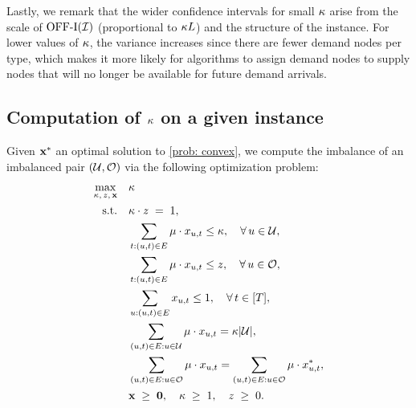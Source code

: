 {{Lastly, we remark that the wider confidence intervals for small $\kappa$ arise from the scale of $\mathrm{\mathrm{OFF}}\textrm{-}\mathrm{I}(\mathcal I)$ (proportional to $\kappa L$) and the structure of the instance. For lower values of $\kappa$, the variance increases since there are fewer demand nodes per type, which makes it more likely for algorithms to assign demand nodes to supply nodes that will no longer be available for future demand arrivals.}










\subsection{Computation of $\kappa$ on a given instance}
\label{ssec: computation_kappa_instance}

Given $\mathbf{x}^*$ an optimal solution to \ref{prob: convex}, we compute the imbalance of an imbalanced pair $(\mathcal U, \mathcal O)$ via the following optimization problem:
\begin{align}
\max_{\kappa,\, z,\, \mathbf{x}} \quad 
& \kappa  \notag\\
\text{s.t.}\quad 
& \kappa \cdot z \;=\; 1, \label{cons: kappa_z}\\
& \sum_{t : (u,t) \in E} \mu \cdot x_{u,t} \leq \kappa,
  \quad \forall\, u \in \mathcal U, \label{cons: kappa_undersup}\\
& \sum_{t : (u,t) \in E} \mu \cdot x_{u,t} \leq z,
  \quad \forall\, u \in \mathcal O, \label{cons: kappa_oversup}\\
& \sum_{u : (u,t) \in E} x_{u,t} \leq 1,
  \quad \forall\, t \in [T], \label{cons: kappa_demand}\\
& \sum_{(u,t) \in E: u \in \mathcal U}
    \mu \cdot x_{u,t} 
  = \kappa  |\mathcal U|, \label{cons: kappa_undersup_guarantee}\\
& \sum_{(u,t) \in E: u \in \mathcal O}
    \mu \cdot x_{u,t} =
  \sum_{(u,t) \in E : u \in \mathcal O}
      \mu \cdot x^*_{u,t}, \label{cons: kappa_oversup_guarantee}\\
& \mathbf{x} \;\ge\; \mathbf{0}, 
  \quad \kappa \;\ge\; 1, 
  \quad z \;\ge\; 0 \label{cons: kappa_feasibility}.
\end{align}

}
